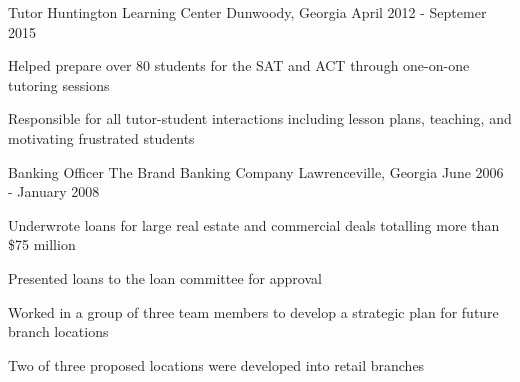 \begin{cventries}
\cventry
    {Tutor} %
    {Huntington Learning Center} %
    {Dunwoody, Georgia} %
    {April 2012 - Septemer 2015} %
    {
      \begin{cvitems} %
        \item {Helped prepare over 80 students for the SAT and ACT through one-on-one tutoring sessions}
        \item {Responsible for all tutor-student interactions including lesson plans, teaching, and motivating frustrated students}
      \end{cvitems}
    }
  \cventry
    {Banking Officer} %
    {The Brand Banking Company} %
    {Lawrenceville, Georgia} %
    {June 2006 - January 2008} %
    {
      \begin{cvitems} %
        \item {Underwrote loans for large real estate and commercial deals totalling more than \$75 million }
        \item {Presented loans to the loan committee for approval}
        \item {Worked in a group of three team members to develop a strategic plan for future branch locations}
        \item {Two of three proposed locations were developed into retail branches}
      \end{cvitems} 
    }

\end{cventries}
